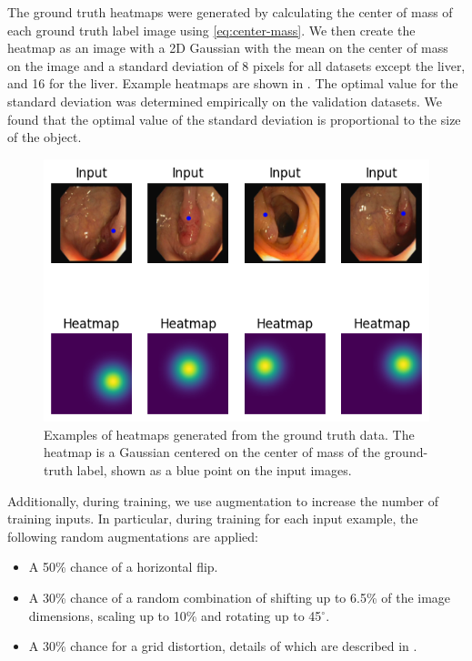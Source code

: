 The ground truth heatmaps were generated by calculating the center of mass of each ground truth label 
image using \eqref{eq:center-mass}. We then create the heatmap as an image with a 2D Gaussian with the
mean on 
the center of mass on the image and a standard deviation of 8 pixels for all datasets except the liver, and 16 for the liver.
Example heatmaps are shown in 
. The optimal value for the standard deviation was determined empirically on the 
validation datasets. We found that the optimal value of the standard deviation is proportional to the size 
of the object.

	\begin{figure}[h]
		\centering
		\includegraphics[width=0.8\linewidth]{images/4/heatmaps}
		\caption{Examples of heatmaps generated from the ground truth data. The heatmap is a Gaussian centered on the center of mass of the ground-truth label, shown as a blue point on the input images. \cite{bencevicTrainingPolarImage2021}}
		\label{fig:heatmap}
	\end{figure}
	
\clearpage

Additionally, during training, we use augmentation to increase the number of training inputs. In 
particular, during training for each input example, the following random augmentations are applied:

\begin{itemize}
  \item A 50\% chance of a horizontal flip.
  \item A 30\% chance of a random combination of shifting up to 6.5\% of the image dimensions, scaling up 
    to 10\% and rotating up to 45$^{\circ}$.
  \item A 30\% chance for a grid distortion, details of which are described in \cite{info11020125}.
\end{itemize}

